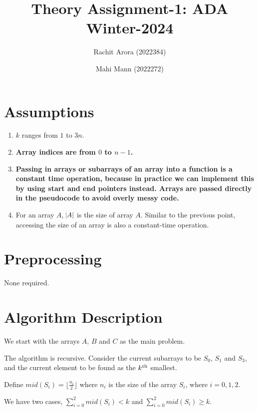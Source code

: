 \documentclass{article}
\title{Theory Assignment-1: ADA Winter-2024}
\author{Rachit Arora (2022384) \and Mahi Mann (2022272)}
\date{}
\begin{document}
\maketitle

\section{Assumptions}

\begin{enumerate}
    \item $k$ ranges from $1$ to $3n$.
    \item \textbf{Array indices are from $0$ to $n-1$.}
    \item \textbf{Passing in arrays or subarrays of an array into a function is a constant time operation, because in practice we can implement this by using start and end pointers instead. Arrays are passed directly in the pseudocode to avoid overly messy code.}
    \item For an array $A$, $\abs{A}$ is the size of array $A$. Similar to the previous point, accessing the size of an array is also a constant-time operation.
\end{enumerate}

\section{Preprocessing}

None required.

\section{Algorithm Description}

We start with the arrays $A$, $B$ and $C$ as the main problem.

The algorithm is recursive. Consider the current subarrays to be $S_0$, $S_1$ and $S_3$, and the current element to be found as the $k\textsuperscript{th}$ smallest.

Define $mid(S_i) = \lfloor \frac{n_i}{2} \rfloor$ where $n_i$ is the size of the array $S_i$, where $i = 0,1,2$.  

We have two cases, $\sum_{i=0}^{2} mid(S_i) < k$ and $\sum_{i=0}^{2} mid(S_i) \geq k$. 
\end{document}
